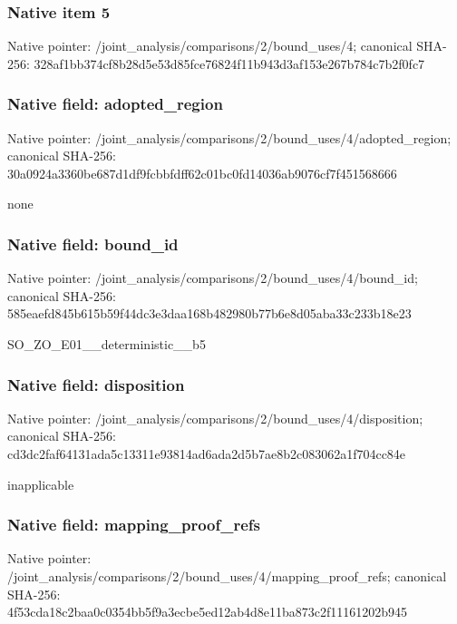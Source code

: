 \documentclass[10pt,a4paper]{article}
\begin{document}
\subsubsection{Native item 5}
Native pointer: /joint\_\allowbreak{}analysis/comparisons/2/bound\_\allowbreak{}uses/4; canonical SHA-256: 328af1bb374cf8b28d5e53d85fce76824f11b943d3af153e267b784c7b2f0fc7

\subsubsection{Native field: adopted\_\allowbreak{}region}
Native pointer: /joint\_\allowbreak{}analysis/comparisons/2/bound\_\allowbreak{}uses/4/adopted\_\allowbreak{}region; canonical SHA-256: 30a0924a3360be687d1df9fcbbfdff62c01bc0fd14036ab9076cf7f451568666

\begingroup\raggedright\sloppy none\par\endgroup

\subsubsection{Native field: bound\_\allowbreak{}id}
Native pointer: /joint\_\allowbreak{}analysis/comparisons/2/bound\_\allowbreak{}uses/4/bound\_\allowbreak{}id; canonical SHA-256: 585eaefd845b615b59f44dc3e3daa168b482980b77b6e8d05aba33c233b18e23

\begingroup\raggedright\sloppy SO\_\allowbreak{}ZO\_\allowbreak{}E01\_\allowbreak{}\_\allowbreak{}deterministic\_\allowbreak{}\_\allowbreak{}b5\par\endgroup

\subsubsection{Native field: disposition}
Native pointer: /joint\_\allowbreak{}analysis/comparisons/2/bound\_\allowbreak{}uses/4/disposition; canonical SHA-256: cd3dc2faf64131ada5c13311e93814ad6ada2d5b7ae8b2c083062a1f704cc84e

\begingroup\raggedright\sloppy inapplicable\par\endgroup

\subsubsection{Native field: mapping\_\allowbreak{}proof\_\allowbreak{}refs}
Native pointer: /joint\_\allowbreak{}analysis/comparisons/2/bound\_\allowbreak{}uses/4/mapping\_\allowbreak{}proof\_\allowbreak{}refs; canonical SHA-256: 4f53cda18c2baa0c0354bb5f9a3ecbe5ed12ab4d8e11ba873c2f11161202b945
\end{document}
